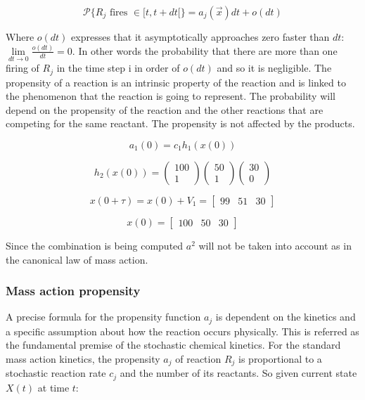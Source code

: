     $$\mathcal{P}\{R_j\text{ fires }\in [t,t+dt[\} = a_j(\vec{x})dt + o(dt)$$

    Where $o(dt)$ expresses that it asymptotically approaches zero faster than $dt$: $\lim\limits_{dt\rightarrow 0} \frac{o(dt)}{dt} = 0$.
    In other words the probability that there are more than one firing of $R_j$ in the time step i in order of $o(dt)$ and so it is negligible.
    The propensity of a reaction is an intrinsic property of the reaction and is linked to the phenomenon that the reaction is going to represent.
    The probability will depend on the propensity of the reaction and the other reactions that are competing for the same reactant.
    The propensity is not affected by the products.

    $$a_1 (0) = c_1 h_1 (x(0))$$

    $$h_2(x(0)) = \begin{pmatrix}100 \\ 1 \end{pmatrix}\begin{pmatrix}50 \\ 1 \end{pmatrix}\begin{pmatrix}30 \\ 0 \end{pmatrix}$$

    $$x(0+ \tau) = x(0) + V_1 = \begin{bmatrix}99 &51& 30 \end{bmatrix}$$

    $$x(0) = \begin{bmatrix}100 &50& 30 \end{bmatrix}$$

    Since the combination is being computed $a^2$ will not be taken into account as in the canonical law of mass action.


    \subsubsection{Mass action propensity}
    A precise formula for the propensity function $a_j$ is dependent on the kinetics and a specific assumption about how the reaction occurs physically.
    This is referred as the fundamental premise of the stochastic chemical kinetics.
    For the standard mass action kinetics, the propensity $a_j$ of reaction $R_j$ is proportional to a stochastic reaction rate $c_j$ and the number of its reactants.
    So given current state $X(t)$ at time $t$:

